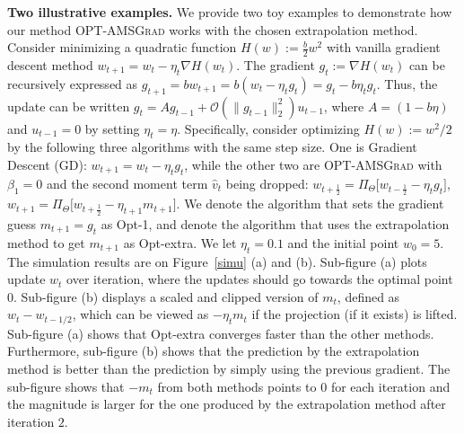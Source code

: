 \documentclass[wcp]{jmlr}
\begin{document}
\textbf{Two illustrative examples.}\hspace{0.1in} 
We provide two toy examples to demonstrate how our method \textsc{OPT-AMSGrad} works with the chosen extrapolation method. 
Consider minimizing a quadratic function $H(w) := \frac{b}{2} w^2 $ with vanilla gradient descent method $w_{t+1} = w_t - \eta_t \nabla H(w_t)$. 
The gradient $g_{t}:= \nabla H(w_{t})$ can be recursively expressed as  $g_{t+1} = b w_{t+1} = b ( w_t  - \eta_t g_t ) = g_t - b \eta_t g_t  $.
Thus, the update can be written $g_t = A g_{t-1}  + \mathcal{O}( \| g_{t-1} \|_2^2 ) u_{t-1}$, where $A = (1 - b \eta)$ and $u_{t-1}=0$ by setting $\eta_t=\eta$.
Specifically, consider optimizing $H(w) := w^2/2 $ by the following three algorithms with the same step size.
One is Gradient Descent (GD): $w_{t+1} = w_t - \eta_t g_t$, while the other two are \textsc{OPT-AMSGrad} with $\beta_1=0$ and the second moment term $\hat{v}_t$ being dropped: $w_{t+\frac{1}{2}} = \Pi_{\Theta}\big[ w_{t-\frac{1}{2}} - \eta_t g_t \big]$, $w_{t+1} = \Pi_{\Theta}\big[ w_{t+\frac{1}{2}} - \eta_{t+1} m_{t+1} \big]$. 
We denote the algorithm that sets the gradient guess $m_{t+1}= g_t$ as Opt-1, and denote the algorithm that uses the extrapolation method to get $m_{t+1}$ as Opt-extra.
We let $\eta_t=0.1$ and the initial point $w_0=5$.
The simulation results are on Figure~\ref{simu} (a) and (b). 
Sub-figure (a) plots update $w_t$ over iteration, where the updates should go towards the optimal point $0$.
Sub-figure (b) displays a scaled and clipped version of $m_t$, defined as $w_t - w_{t-1/2}$, which can be viewed as $- \eta_t m_{t}$ if the projection (if it exists) is lifted.
Sub-figure (a) shows that Opt-extra converges faster than the other methods. 
Furthermore, sub-figure (b) shows that the prediction by the extrapolation method is better than the prediction by simply using the previous gradient. 
The sub-figure shows that $-m_t$ from both methods points to $0$ for each iteration and the magnitude is larger for the one produced by the extrapolation method after iteration $2$. 
\end{document}
